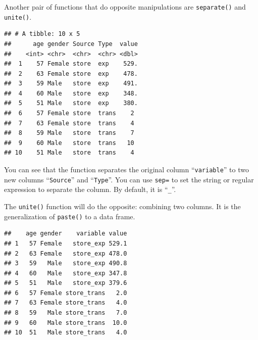 \documentclass[12pt,]{krantz}
\makeatletter
\newenvironment{Shaded}{\begin{snugshade}}{\end{snugshade}}
\newcommand{\DataTypeTok}[1]{\textcolor[rgb]{0.27,0.27,0.27}{#1}}
\newcommand{\KeywordTok}[1]{\textcolor[rgb]{0.27,0.27,0.27}{\textbf{#1}}}
\newcommand{\NormalTok}[1]{#1}
\newcommand{\OperatorTok}[1]{\textcolor[rgb]{0.43,0.43,0.43}{\textbf{#1}}}
\newcommand{\StringTok}[1]{\textcolor[rgb]{0.5,0.5,0.5}{#1}}
\newenvironment{kframe}{%
\medskip{}
\setlength{\fboxsep}{.8em}
 \def\at@end@of@kframe{}%
 \ifinner\ifhmode%
  \def\at@end@of@kframe{\end{minipage}}%
  \begin{minipage}{\columnwidth}%
 \fi\fi%
 \def\FrameCommand##1{\hskip\@totalleftmargin \hskip-\fboxsep
 \colorbox{shadecolor}{##1}\hskip-\fboxsep
     \hskip-\linewidth \hskip-\@totalleftmargin \hskip\columnwidth}%
 \MakeFramed {\advance\hsize-\width
   \@totalleftmargin\z@ \linewidth\hsize
   \@setminipage}}%
 {\par\unskip\endMakeFramed%
 \at@end@of@kframe}
\renewenvironment{Shaded}{\begin{kframe}}{\end{kframe}}
\makeatother
\begin{document}
Another pair of functions that do opposite manipulations are \texttt{separate()} and \texttt{unite()}.

\begin{Shaded}
\end{Shaded}

\begin{verbatim}
## # A tibble: 10 x 5
##      age gender Source Type  value
##    <int> <chr>  <chr>  <chr> <dbl>
##  1    57 Female store  exp    529.
##  2    63 Female store  exp    478.
##  3    59 Male   store  exp    491.
##  4    60 Male   store  exp    348.
##  5    51 Male   store  exp    380.
##  6    57 Female store  trans    2 
##  7    63 Female store  trans    4 
##  8    59 Male   store  trans    7 
##  9    60 Male   store  trans   10 
## 10    51 Male   store  trans    4
\end{verbatim}

You can see that the function separates the original column ``\texttt{variable}'' to two new columns ``\texttt{Source}'' and ``\texttt{Type}''. You can use \texttt{sep=} to set the string or regular expression to separate the column. By default, it is ``\texttt{\_}''.

The \texttt{unite()} function will do the opposite: combining two columns. It is the generalization of \texttt{paste()} to a data frame.

\begin{Shaded}
\end{Shaded}

\begin{verbatim}
##    age gender    variable value
## 1   57 Female   store_exp 529.1
## 2   63 Female   store_exp 478.0
## 3   59   Male   store_exp 490.8
## 4   60   Male   store_exp 347.8
## 5   51   Male   store_exp 379.6
## 6   57 Female store_trans   2.0
## 7   63 Female store_trans   4.0
## 8   59   Male store_trans   7.0
## 9   60   Male store_trans  10.0
## 10  51   Male store_trans   4.0
\end{verbatim}
\end{document}
